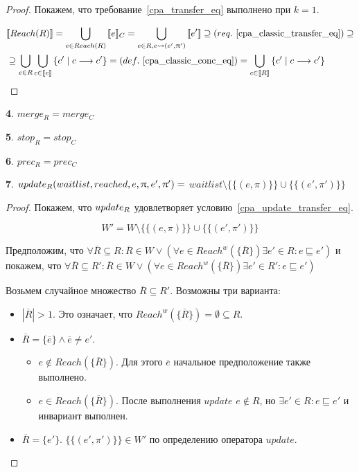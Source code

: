 \begin{proof}
Покажем, что требование~\ref{cpa_transfer_eq} выполнено при $k = 1$.

\begin{align}
& \conc{Reach(R)} = \bigcup_{e\in Reach(R)}{\conc{e}_C} = \bigcup_{e \in R, e \tatarrow (e', \pi')}{\conc{e'}} \supseteq (req.~\ref{cpa_classic_transfer_eq}) \supseteq \nonumber \\
& \supseteq \bigcup_{e \in R} {\bigcup_{c \in \conc{e}}{\{c' \mid c \tcarrow c'\}}} = (def.~\ref{cpa_classic_conc_eq}) = \bigcup_{c \in \conc{R}}{\{c' \mid c \tcarrow c'\}} \nonumber
\end{align}
\end{proof}

{\textbf 4.} $merge_R = merge_C$

{\textbf 5.} $stop_R = stop_C$

{\textbf 6.} $prec_R = prec_C$

{\textbf 7.}
$update_R(waitlist, reached, e, \uppi, e', \uppi')=$ 
$waitlist \setminus \{\{(e, \pi)\}\} \cup \{\{(e', \pi')\}\}$

\begin{proof}
Покажем, что $update_R$ удовлетворяет условию~\ref{cpa_update_transfer_eq}.

$$ W' = W \setminus \{\{(e, \pi)\}\} \cup \{\{(e', \pi')\}\}$$

Предположим, что 
$\forall \overline{R} \subseteq R: \overline{R} \in W \lor (\forall e \in Reach^w(\{\overline{R}\}) \exists e' \in R: e \sqsubseteq e')$ 
и покажем, что
$\forall \overline{R} \subseteq R': \overline{R} \in W \lor (\forall e \in Reach^w(\{\overline{R}\}) \exists e' \in R': e \sqsubseteq e')$

Возьмем случайное множество $\overline{R} \subseteq R'$. Возможны три варианта:

\begin{itemize}
\item $|\overline{R}| > 1$. Это означает, что $Reach^w(\{\overline{R}\}) = \emptyset \subseteq R$.
\item $\overline{R} = \{\overline{e}\} \land \overline{e} \neq e'$.
\begin{itemize}
\item $e \notin Reach(\{\overline{R}\})$. Для этого $\overline{e}$ начальное предположение также выполнено.
\item $e \in Reach(\{\overline{R}\})$. После выполнения $update$ $e \notin R$, но $\exists e' \in R: e \sqsubseteq e'$ и инвариант выполнен.
\end{itemize}
\item $\overline{R} = \{e'\}$. $\{\{(e', \pi')\}\} \in W'$ по определению оператора $update$.
\end{itemize}

\end{proof}


